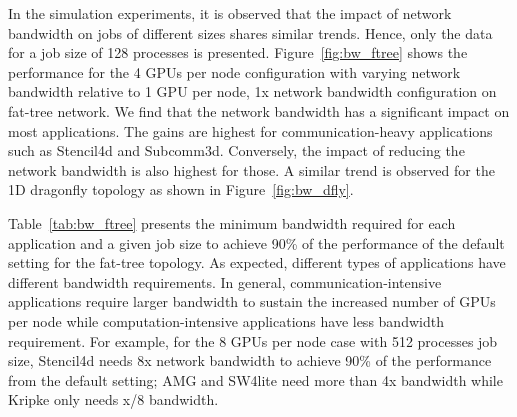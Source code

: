 In the simulation experiments, it is observed that the impact of network bandwidth on jobs of different sizes
shares similar trends. Hence, only the data for a job size of 128 processes is presented.
Figure~\ref{fig:bw_ftree} shows the performance for the 4 GPUs per node
configuration with varying network bandwidth relative to 1 GPU per node, 1x
network bandwidth configuration on fat-tree network. We find that the network
bandwidth has a significant impact on most applications.  The gains are  highest
for communication-heavy applications such as Stencil4d and Subcomm3d.
Conversely, the impact of reducing the network bandwidth is also highest for
those.  A similar trend is observed for the 1D dragonfly topology as
shown in Figure~\ref{fig:bw_dfly}.

Table~\ref{tab:bw_ftree} presents the minimum bandwidth required for each
application and a given job size to achieve 90\% of the performance of the
default setting for the fat-tree topology.  As expected, different types of
applications have different bandwidth requirements. In general,
communication-intensive applications require larger bandwidth to sustain the
increased number of GPUs per node while computation-intensive applications have
less bandwidth requirement. For example, for the 8 GPUs per node case with 512 processes
job size, Stencil4d needs 8x network bandwidth
to achieve 90\% of the performance from the default setting; AMG and SW4lite need more than 
4x bandwidth while
Kripke only needs x/8 bandwidth. 

\begin{table}[!htbp]
  \centering
  \caption{Minimum bandwidth required to achieve 90\% of the performance of the
  default 1 GPU/node configuration for fat-tree}
    \label{tab:bw_ftree}
    \vspace{-1em}
\end{table}

